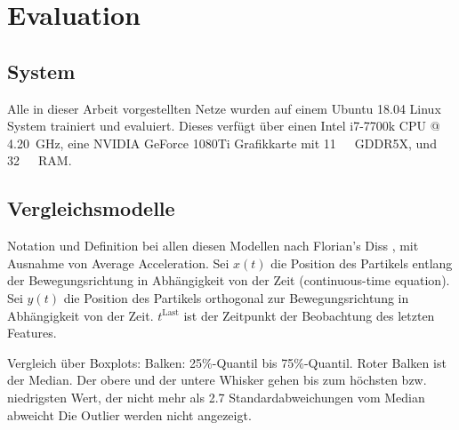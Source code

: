 \chapter{Evaluation}
\label{cap:Eval}


\section{System}

Alle in dieser Arbeit vorgestellten Netze wurden auf einem Ubuntu 18.04 Linux System trainiert und evaluiert.
Dieses verfügt über einen Intel i7-7700k CPU @ \SI{4.20}{\giga\hertz}, eine NVIDIA GeForce 1080Ti Grafikkarte mit \SI{11}{\giga\byte}~GDDR5X,
und \SI{32}{\giga\byte}~RAM. 


\section{Vergleichsmodelle}

\color{blue}
Notation und Definition bei allen diesen Modellen nach Florian's Diss \cite{Pfaff2018}, mit Ausnahme von Average Acceleration.
Sei \(x(t)\) die Position des Partikels entlang der Bewegungsrichtung in Abhängigkeit von der Zeit
(continuous-time equation).
Sei \( y(t)\) die Position des Partikels orthogonal zur Bewegungsrichtung in Abhängigkeit von der Zeit.
\(t^{\text{Last}}\) ist der Zeitpunkt der Beobachtung des letzten Features.

Vergleich über Boxplots: Balken: 25\%-Quantil bis 75\%-Quantil.
Roter Balken ist der Median. Der obere und der untere Whisker 
gehen bis zum höchsten bzw. niedrigsten Wert, der nicht mehr als 2.7 Standardabweichungen vom Median abweicht
Die Outlier werden nicht angezeigt.

\color{black}

